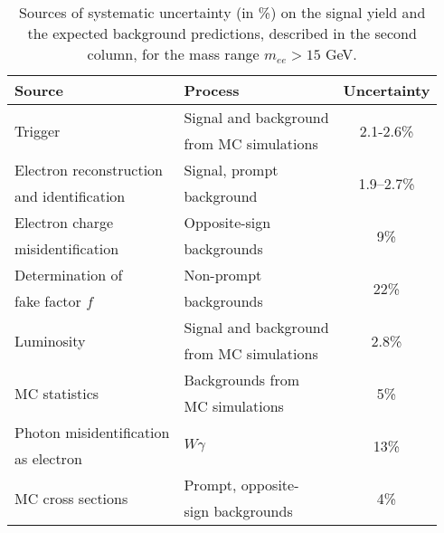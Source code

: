 \begin{table}[ht]
\begin{center}
\begin{tabular}{l|l|c}
Source & Process & Uncertainty \\
\hline
\multirow{2}{*}{Trigger} & Signal and background & \multirow{2}{*}{2.1-2.6\%}  \\
& from MC simulations &\\
\hline
Electron reconstruction & Signal, prompt &\multirow{2}{*}{1.9--2.7\%}\\
and identification & background&\\\hline
Electron charge  & Opposite-sign& \multirow{2}{*}{9\%} \\
misidentification& backgrounds&\\\hline
Determination of & Non-prompt &\multirow{2}{*}{22\%}\\
fake factor $f$& backgrounds&  \\\hline
\multirow{2}{*}{Luminosity} & Signal and background& \multirow{2}{*}{2.8\%}\\
& from MC simulations&\\\hline
\multirow{2}{*}{MC statistics} & Backgrounds from &  \multirow{2}{*}{5\%}\\
& MC simulations &\\\hline
Photon misidentification & \multirow{2}{*}{$W\gamma$} & \multirow{2}{*}{13\%}\\
as electron&&\\\hline
\multirow{2}{*}{MC cross sections} & Prompt, opposite-& \multirow{2}{*}{4\%}\\
& sign backgrounds & \\
\end{tabular}
\end{center}
\caption{Sources of systematic uncertainty (in \%) on the signal yield and the expected background predictions, described in the second column, for the mass range $m_{ee} > 15$ GeV.
}
\label{tab:syst}
\end{table}


